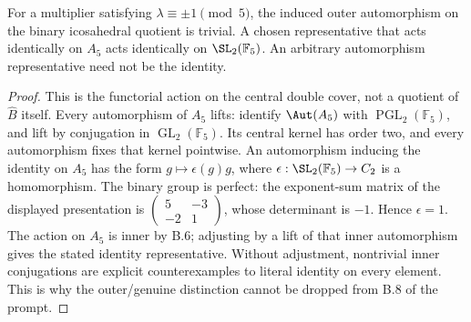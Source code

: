 For a multiplier satisfying \(\lambda\equiv\pm1\pmod5\),
the induced outer automorphism on the binary icosahedral quotient
is trivial. A chosen representative that acts identically on
\(A_5\) acts identically on \(\SL_2(\mathbb F_5)\).
An arbitrary automorphism representative need not be the identity.
\begin{proof}
This is the functorial action on the central double cover, not
a quotient of \(\widehat B\) itself. Every automorphism of
\(A_5\) lifts: identify \(\Aut(A_5)\) with
\(\operatorname{PGL}_2(\mathbb F_5)\), and lift by conjugation
in \(\operatorname{GL}_2(\mathbb F_5)\).
Its central kernel has order two, and every automorphism fixes
that kernel pointwise. An automorphism inducing the identity on
\(A_5\) has the form \(g\mapsto\epsilon(g)g\), where
\(\epsilon:\SL_2(\mathbb F_5)\to C_2\) is a homomorphism.
The binary group is perfect: the exponent-sum matrix of the
displayed presentation is
\(\left(\begin{smallmatrix}5&-3\\-2&1\end{smallmatrix}\right)\),
whose determinant is \(-1\). Hence \(\epsilon=1\).
The action on \(A_5\) is inner by B.6; adjusting by a lift
of that inner automorphism gives the stated identity representative.
Without adjustment, nontrivial inner conjugations are explicit
counterexamples to literal identity on every element. This is
why the outer/genuine distinction cannot be dropped from B.8
of the prompt.
\end{proof}
